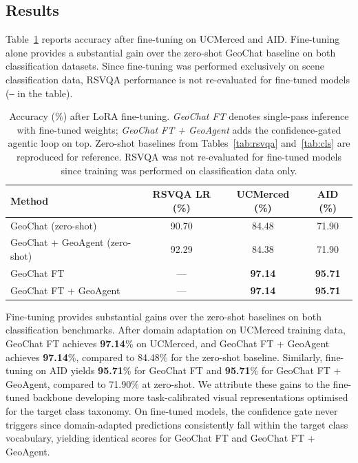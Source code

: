 \documentclass{article}
\begin{document}
\subsection{Results}

Table~\ref{tab:finetune} reports accuracy after fine-tuning on UCMerced and AID.
Fine-tuning alone provides a substantial gain over the zero-shot GeoChat baseline
on both classification datasets.  Since fine-tuning was performed exclusively on
scene classification data, RSVQA performance is not re-evaluated for fine-tuned
models (\texttt{---} in the table).

\begin{table}[t]
  \caption{Accuracy (\%) after LoRA fine-tuning.  \emph{GeoChat FT} denotes
    single-pass inference with fine-tuned weights; \emph{GeoChat FT +
    GeoAgent} adds the confidence-gated agentic loop on top.  Zero-shot
    baselines from Tables~\ref{tab:rsvqa} and~\ref{tab:cls} are reproduced
    for reference.  RSVQA was not re-evaluated for fine-tuned models since
    training was performed on classification data only.}
  \label{tab:finetune}
  \centering
  \begin{tabular}{lccc}
    \toprule
    \textbf{Method} & \textbf{RSVQA LR (\%)} & \textbf{UCMerced (\%)} & \textbf{AID (\%)} \\
    \midrule
    GeoChat (zero-shot)            & 90.70 & 84.48 & 71.90 \\
    GeoChat + GeoAgent (zero-shot) & 92.29 & 84.38 & 71.90 \\
    \midrule
    GeoChat FT                     & ---   & \textbf{97.14} & \textbf{95.71} \\
    GeoChat FT + GeoAgent          & ---   & \textbf{97.14} & \textbf{95.71} \\
    \bottomrule
  \end{tabular}
\end{table}

Fine-tuning provides substantial gains over the zero-shot baselines on both
classification benchmarks.  After domain adaptation on UCMerced training data,
GeoChat FT achieves \textbf{97.14}\% on UCMerced, and GeoChat FT + GeoAgent
achieves \textbf{97.14}\%, compared to 84.48\% for the zero-shot baseline.
Similarly, fine-tuning on AID yields \textbf{95.71}\% for GeoChat FT and
\textbf{95.71}\% for GeoChat FT + GeoAgent, compared to 71.90\% at zero-shot.
We attribute these gains to the fine-tuned backbone developing more
task-calibrated visual representations optimised for the target class taxonomy.
On fine-tuned models, the confidence gate never triggers since domain-adapted
predictions consistently fall within the target class vocabulary, yielding
identical scores for GeoChat FT and GeoChat FT + GeoAgent.
\end{document}
